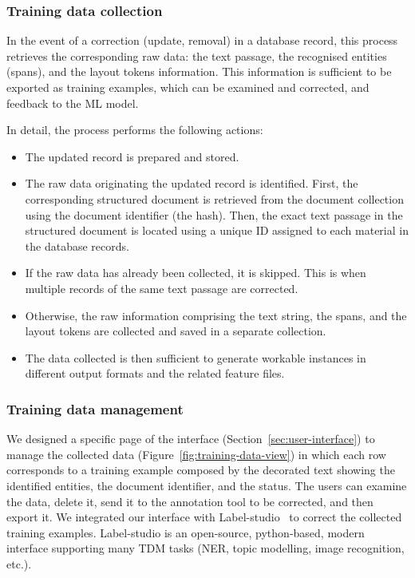 \subsubsection{Training data collection}
In the event of a correction (update, removal) in a database record, this process retrieves the corresponding raw data: the text passage, the recognised entities (spans), and the layout tokens information. 
This information is sufficient to be exported as training examples, which can be examined and corrected, and feedback to the ML model. 

In detail, the process performs the following actions:
\begin{itemize}
    \item The updated record is prepared and stored.
    \item The raw data originating the updated record is identified. First, the corresponding structured document is retrieved from the document collection using the document identifier (the hash). Then, the exact text passage in the structured document is located using a unique ID assigned to each material in the database records.
    \item If the raw data has already been collected, it is skipped. This is when multiple records of the same text passage are corrected.
    \item Otherwise, the raw information comprising the text string, the spans, and the layout tokens are collected and saved in a separate collection.
    \item The data collected is then sufficient to generate workable instances in different output formats and the related feature files.
\end{itemize}

\subsubsection{Training data management}
We designed a specific page of the interface (Section~\ref{sec:user-interface}) to manage the collected data (Figure~\ref{fig:training-data-view}) in which each row corresponds to a training example composed by the decorated text showing the identified entities, the document identifier, and the status. 
The users can examine the data, delete it, send it to the annotation tool to be corrected, and then export it.
We integrated our interface with Label-studio~\cite{Label_Studio} to correct the collected training examples. 
Label-studio is an open-source, python-based, modern interface supporting many TDM tasks (NER, topic modelling, image recognition, etc.). 

